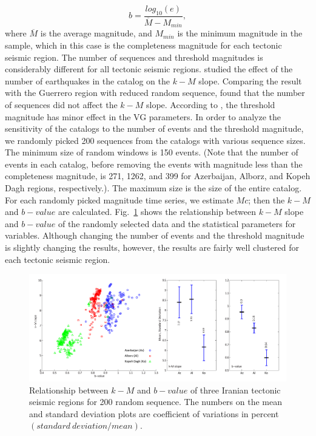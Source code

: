 \begin{equation}
b = \frac{log_{10}(e) }{\overline{M} - M_{min}},
\end{equation}
 \noindent
where $\overline{M}$ is the average magnitude, and  $M_ {min}$ is the minimum magnitude in the sample, which in this case is the completeness magnitude for each tectonic seismic region. The number of sequences and threshold magnitudes is considerably different for all tectonic seismic regions.  \citet{Telesca2013}  studied the effect of the number of earthquakes in the catalog on the  $k-M$  slope. Comparing the result with the Guerrero region with reduced random sequence,  \citet{Telesca2013}  found that the number of sequences did not affect the  $k-M$  slope.  According to  \citet{Telesca2012}, the threshold magnitude has minor effect in the VG parameters. In order to analyze the sensitivity of the catalogs to the number of events and the threshold magnitude, we randomly picked 200 sequences from the catalogs with various sequence sizes. The minimum size of random windows is 150 events. (Note that the number of events in each catalog, before removing the events with magnitude less than the completeness magnitude, is 271, 1262, and 399 for Azerbaijan, Alborz, and Kopeh Dagh regions, respectively.). The maximum size is the size of the entire catalog. For each randomly picked magnitude time series,  we estimate $Mc$; then the $k-M$  and $b-value$ are calculated. Fig.~\ref{fig:random} shows the relationship between  $k-M$  slope and  $b-value$  of the randomly selected data and the statistical parameters for variables. Although changing the number of events and the threshold magnitude is slightly changing the results, however,  the results are fairly well clustered for each tectonic seismic region. 
   
 \begin{figure} [ht]
\centering
\includegraphics[scale=0.5]{figures/pdf/Figure07.pdf} 
\caption{ Relationship between $k-M$ and $b-value$ of three Iranian tectonic seismic regions for 200 random sequence. The numbers on the mean and standard deviation plots are coefficient of variations in percent $(standard \ deviation / mean)$.}
\label{fig:random}
\end{figure}

